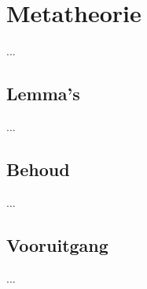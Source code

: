 \chapter{Metatheorie}
\label{hoofdstuk:metatheorie}
... 

\section{Lemma's}
...

\section{Behoud}
...

\section{Vooruitgang}
...

